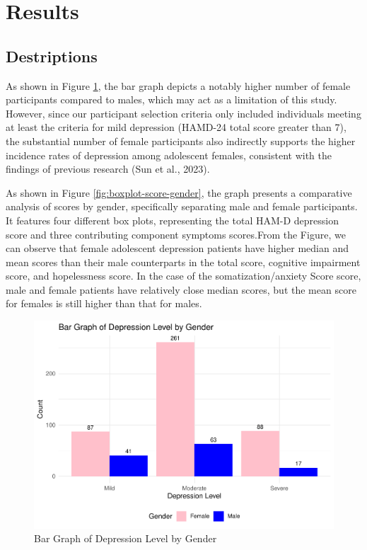 \documentclass[
  man,floatsintext]{apa6}
\begin{document}
\hypertarget{results}{%
\section{Results}\label{results}}

\hypertarget{destriptions}{%
\subsection{Destriptions}\label{destriptions}}

As shown in Figure \ref{fig:gender-depression-bar}, the bar graph depicts a notably higher number of female participants compared to males, which may act as a limitation of this study. However, since our participant selection criteria only included individuals meeting at least the criteria for mild depression (HAMD-24 total score greater than 7), the substantial number of female participants also indirectly supports the higher incidence rates of depression among adolescent females, consistent with the findings of previous research (Sun et al., 2023).

As shown in Figure \ref{fig:boxplot-score-gender}, the graph presents a comparative analysis of scores by gender, specifically separating male and female participants. It features four different box plots, representing the total HAM-D depression score and three contributing component symptoms scores.From the Figure, we can observe that female adolescent depression patients have higher median and mean scores than their male counterparts in the total score, cognitive impairment score, and hopelessness score. In the case of the somatization/anxiety Score score, male and female patients have relatively close median scores, but the mean score for females is still higher than that for males.

\begin{figure}
\centering
\includegraphics{final_files/figure-latex/gender-depression-bar-1.pdf}
\caption{\label{fig:gender-depression-bar}Bar Graph of Depression Level by Gender}
\end{figure}
\end{document}
